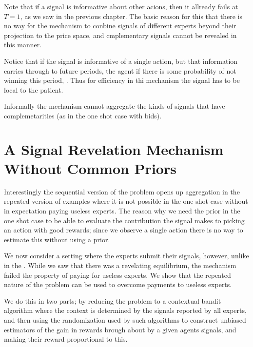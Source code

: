  Note that if a signal is informative about other acions, then it allready fails at $T=1$, as we saw in the previous chapter. The basic reason for this that there is no way for the mechanism to conbine signals of different experts beyond their projection to the price space, and cmplementary signals cannot be revealed in this manner. 

 Notice that if the signal is informative of a single action, but that information carries through to future periods, the agent if there is some probability of not winning this period, . Thus for efficiency in thi mechanism the signal has to be local to the patient.






Informally the mechanism cannot aggregate the kinds of signals that have complemetarities (as in the one shot case with bids).


\section{A Signal Revelation Mechanism Without Common Priors}

Interestingly the sequential version of the problem opens up aggregation in the repeated version of examples where it is not possible in the one shot case without in expectation paying useless experts. 
The reason why we need the prior in the one shot case to be able to evaluate the contribution the signal makes to picking an action with good rewards; since we observe a single action there is no way to estimate this without using a prior. 

We now consider a setting where the experts submit their signals, however, unlike in the .
 While we saw that there was a revelating equilibrium, the mechanism failed the property of paying for useless experts. We show that the repeated nature of the problem can be used to overcome payments to useless experts. 

We do this in two parts; by reducing the problem to a contextual bandit algorithm where the context is determined by the signals reported by all experts, and then using the randomization used by such algorithms to construct unbiased estimators of the gain in rewards brough about by a given agents signals, and making their reward proportional to this. 

